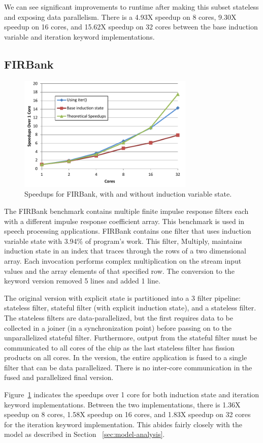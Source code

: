 We can see significant improvements to runtime after making this subset stateless and exposing data parallelism.  There is a 4.93X speedup on 8 cores, 9.30X speedup on 16 cores, and 15.62X speedup on 32 cores between the base induction variable and iteration keyword implementations.  

\subsection{FIRBank}
\begin{figure}[t]
\includegraphics[width=3.3in]{figures/firbank-results.pdf}
\caption{Speedups for FIRBank, with and without induction variable state.  \protect\label{fig:firbank-results}}
\end{figure}

The FIRBank benchmark contains multiple finite impulse response
filters each with a different impulse response coefficient array. This
benchmark is used in speech processing applications. FIRBank contains
one filter that uses induction variable state with 3.94\% of program's
work. This filter, Multiply, maintains induction state in an index
that traces through the rows of a two dimensional array. Each
invocation performs complex multiplication on the stream input values
and the array elements of that specified row.  The conversion to the
\iter keyword version removed 5 lines and added 1 line.

The original version with explicit state is partitioned into a 3
filter pipeline: stateless filter, stateful filter (with explicit
induction state), and a stateless filter. The stateless filters are
data-parallelized, but the first requires data to be collected in a
joiner (in a synchronization point) before passing on to the
unparallelized stateful filter. Furthermore, output from the stateful
filter must be communicated to all cores of the chip as the last
stateless filter has fission products on all cores.  In the \iter
version, the entire application is fused to a single filter that can
be data parallelized.  There is no inter-core communication in the
fused and parallelized final version.

Figure~\ref{fig:firbank-results} indicates the speedups over 1 core
for both induction state and iteration keyword implementations.
Between the two implementations, there is 1.36X speedup on 8 cores,
1.58X speedup on 16 cores, and 1.83X speedup on 32 cores for the
iteration keyword implementation. This abides fairly closely with the
model as described in Section ~\ref{sec:model-analysis}.
